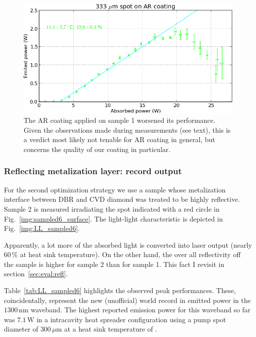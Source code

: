 \begin{figure}
\centering
\includegraphics[width=14.5cm]{img/LL_sampleAR.png}
\caption{The AR coating
applied on sample 1 worsened its performance.
Given the observations made
during measurements
(see text),
this is a verdict most likely
not tenable for AR coating in general,
but concerns the quality of our coating in particular.}
\label{img:LL_sampleAR}
\end{figure}

\subsubsection{Reflecting metalization layer: record output}

For the second optimization strategy
\cite{Hader2011}
we use a sample
whose metalization interface
between DBR and CVD diamond
was treated to be highly reflective.
Sample 2 is measured
irradiating the spot
indicated with a red circle
in Fig.~\ref{img:sampled6_surface}.
The light-light characteristic
is depicted in Fig.~\ref{img:LL_sampled6}.

Apparently,
a lot more of the absorbed light
is converted into laser output
(nearly $60\,\%$
at  heat sink temperature).
On the other hand,
the over all reflectivity off the sample
is higher for sample 2
than for sample 1.
This fact I revisit
in section~\ref{sec:eval:refl}. 

Table~\ref{tab:LL_sampled6} highlights
the observed peak performances.
These, coincidentally,
represent the new
(unofficial)
world record
in emitted power
in the $1300\,\mathrm{nm}$ waveband.
The highest reported emission power
for this waveband so far
was $7.1\,\mathrm{W}$
in a intracavity heat spreader configuration
using a pump spot diameter of $300\,\mu\mathrm{m}$
at a heat sink temperature
of 
\cite{Sirbu2014OptExp}.

